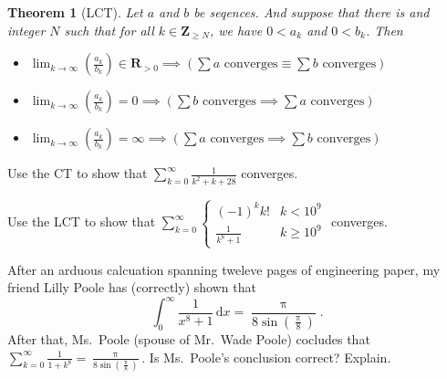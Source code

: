 \documentclass[12pt,fleqn]{exam}
\newcommand{\reals}{\mathbf{R}}
\newcommand{\integers}{\mathbf{Z}}
\newtheorem{theorem}{Theorem}
\begin{document}
\begin{theorem}[LCT] Let $a$ and $b$ be seqences. And suppose that there is and integer $N$ such that for all $k \in \integers_{\geq N}$, we have
$0 < a_k$ and $0 < b_k$. Then
\begin{itemize}
 \item $\displaystyle \lim_{k \to \infty} \left(\frac{a_k}{b_k} \right) \in \reals_{>0} \implies  \left( \sum a  \text{ converges} \equiv \sum b  \text{ converges} \right) $
 \item $\displaystyle \lim_{k \to \infty} \left( \frac{a_k}{b_k} \right) = 0 \implies  \left( \sum b  \text{ converges} \implies \sum a  \text{ converges} \right) $
  \item $\displaystyle \lim_{k \to \infty} \left(\frac{a_k}{b_k} \right) = \infty  \implies  \left( \sum a  \text{ converges} \implies \sum b  \text{ converges} \right) $
 
 
\end{itemize}


\end{theorem}
\begin{questions}

\question [2] Use the CT to show that $\sum_{k=0}^\infty  \frac{1}{k^2 + k + 28}$ converges.

\newpage


\question [2] Use the LCT to show that $\sum_{k=0}^\infty \begin{cases} (-1)^k k! & k < 10^9 \\   \frac{1}{k^8 + 1} & k \geq 10^9 \end{cases}$ converges.



\newpage 

\question [2] After an arduous calcuation spanning tweleve pages of engineering paper, my friend Lilly Poole has (correctly) shown that
\begin{equation*}
\int_{0}^{\infty }{\left. \frac{1}{{{x}^{8}}\operatorname{+}1} \, \mathrm{d} x\right.}\operatorname{=}\frac{\ensuremath{\uppi} }{8 \sin{\left( \frac{\ensuremath{\uppi} }{8}\right) }}.
\end{equation*}
After that, Ms.\ Poole (spouse of Mr.\  Wade Poole) cocludes that $\sum_{k=0}^\infty \frac{1}{1+k^8} = \frac{\ensuremath{\uppi} }{8 \sin{\left( \frac{\ensuremath{\uppi} }{8}\right) }}$.
Is  Ms.\ Poole's conclusion correct? Explain.

\end{questions}
\end{document}
